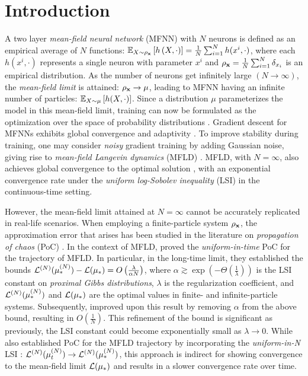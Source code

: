 \section{Introduction}\label{sec:introduction}
A two layer \textit{mean-field neural network} (MFNN) with $N$ neurons is defined as an empirical average of $N$ functions: $\mathbb{E}_{X  \sim \rho_{\mathbf{x}}} \left[h\left( X, \cdot\right) \right] = \frac{1}{N} \sum^N_{i=1} h(x^i, \cdot)$, where each $h(x^i,\cdot)$ represents a single neuron with parameter $x^i$ and $\rho_{\mathbf{x}} = \frac{1}{N} \sum^N_{i=1} \delta_{x_i}$ is an empirical distribution. As the number of neurons get infinitely large $(N \rightarrow \infty)$, the \textit{mean-field limit} is attained: $\rho_{\mathbf{x}} \rightarrow \mu$, leading to MFNN having an infinite number of particles: $\mathbb{E}_{X\sim \mu} \left[ h(X, \cdot)\right]$. Since a distribution $\mu$ parameterizes the model in this mean-field limit, training can now be formulated as the optimization over the space of probability distributions \citep{nitanda2017stochastic}. Gradient descent for MFNNs exhibits global convergence \citep{chizat2018global, mei2018mean} and adaptivity \citep{yang2020feature, ba2022high}. To improve stability during training, one may consider \textit{noisy} gradient training by adding Gaussian noise, giving rise to \textit{mean-field Langevin dynamics} (MFLD) \citep{mei2018mean, hu2019mean}. MFLD, with $N=\infty$, also achieves global convergence to the optimal solution \citep{hu2019mean, jabir2019mean}, with an exponential convergence rate under the \textit{uniform log-Sobolev inequality} (LSI) \cite{nitanda2022convex, chizat2022mean} in the continuous-time setting. 

However, the mean-field limit attained at $N = \infty$ cannot be accurately replicated in real-life scenarios. When employing a finite-particle system $\rho_{\mathbf{x}}$, the approximation error that arises has been studied in the literature on \textit{propagation of chaos} (PoC) \cite{sznitman1991topics}. In the context of MFLD, \citet{chen2022uniform, suzuki2023convergence} proved the \textit{uniform-in-time} PoC for the trajectory of MFLD. In particular, in the long-time limit, they established the bounds $\pow[\cL,N](\pow[\mu,N]_*)-\cL(\mu_*) = O\left(\frac{\lambda}{\alpha N} \right)$, where $\alpha \gtrsim \exp \left(-\Theta \left( \frac{1}{\lambda}\right)\right)$ is the LSI constant on \textit{proximal Gibbs distributions}, $\lambda$ is the regularization coefficient, and $\pow[\cL,N](\pow[\mu,N]_*)$ and $\mathcal{L}(\mu_*)$ are the optimal values in finite- and infinite-particle systems. Subsequently, \citet{nitanda2024improved} improved upon this result by removing $\alpha$ from the above bound, resulting in $O \left( \frac{1}{N}\right)$. This refinement of the bound is significant as previously, the LSI constant could become exponentially small as $\lambda \rightarrow 0$. While \citet{nitanda2024improved} also established PoC for the MFLD trajectory by incorporating the \textit{uniform-in-N} LSI \cite{chewi2024uniform}: $\pow[\cL,N](\pow[\mu,N]_t) \to \pow[\cL,N](\pow[\mu,N]_*)$, this approach is indirect for showing convergence to the mean-field limit $\mathcal{L}(\mu_*)$ and results in a slower convergence rate over time. 

